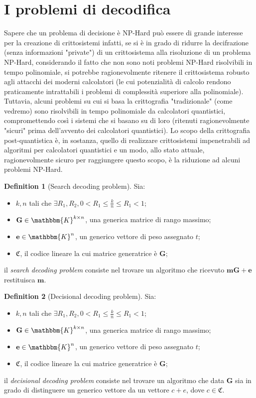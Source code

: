 \documentclass[12pt, a4paper]{report}
\theoremstyle{definition}
\newtheorem{definition}{Definition}[section]
\begin{document}
		\section{I problemi di decodifica \cite{7} \cite{8} \cite{9} \cite{10}}
			Sapere che un problema di decisione è NP-Hard può essere di grande interesse per la creazione di crittosistemi infatti, se si è in grado di ridurre la decifrazione (senza informazioni "private") di un crittosistema alla risoluzione di un problema NP-Hard, considerando il fatto che non sono noti problemi NP-Hard risolvibili in tempo polinomiale, si potrebbe ragionevolmente ritenere il crittosistema robusto agli attacchi dei moderni calcolatori (le cui potenzialità di calcolo rendono praticamente intrattabili i problemi di complessità superiore alla polinomiale). Tuttavia, alcuni problemi su cui si basa la crittografia "tradizionale" (come vedremo) sono risolvibili in tempo polinomiale da calcolatori quantistici, compromettendo così i sistemi che si basano su di loro (ritenuti ragionevolmente "sicuri" prima dell'avvento dei calcolatori quantistici). Lo scopo della crittografia post-quantistica è, in sostanza, quello di realizzare crittosistemi impenetrabili ad algoritmi per calcolatori quantistici e un modo, allo stato attuale, ragionevolmente sicuro per raggiungere questo scopo, è la riduzione ad alcuni problemi NP-Hard.
			\begin{definition}[Search decoding problem]
				Sia:
				\begin{itemize}
					\item $k,n$ tali che $\exists R_1,R_2,0<R_1\leq\frac{k}{n}\leq R_1<1$;
					\item $\mathbf{G}\in\mathbbm{K}^{k\times n}$, una generica matrice di rango massimo;
					\item $\textbf{e}\in\mathbbm{K}^n$, un generico vettore di peso assegnato $t$;
					\item $\mathfrak{C}$, il codice lineare la cui matrice generatrice è $\mathbf{G}$;
				\end{itemize}
				il \emph{search decoding problem} consiste nel trovare un algoritmo che ricevuto $\textbf{m}\mathbf{G}+\textbf{e}$ restituisca $\textbf{m}$.
			\end{definition}
			\begin{definition}[Decisional decoding problem]
				Sia:
				\begin{itemize}
					\item $k,n$ tali che $\exists R_1,R_2,0<R_1\leq\frac{k}{n}\leq R_1<1$;
					\item $\mathbf{G}\in\mathbbm{K}^{k\times n}$, una generica matrice di rango massimo;
					\item $\textbf{e}\in\mathbbm{K}^n$, un generico vettore di peso assegnato $t$;
					\item $\mathfrak{C}$, il codice lineare la cui matrice generatrice è $\mathbf{G}$;
				\end{itemize}
				il \emph{decisional decoding problem} consiste nel trovare un algoritmo che data $\mathbf{G}$ sia in grado di distinguere un generico vettore da un vettore $c+e$, dove $c\in\mathfrak{C}$.
			\end{definition}
\end{document}
